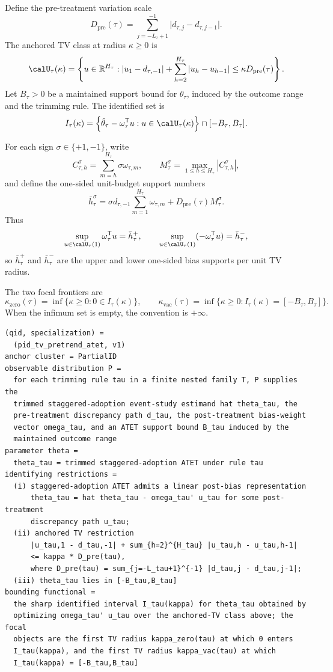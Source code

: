 \documentclass[11pt]{article}
\newcommand{\transpose}{\mathsf{T}}
\newcommand{\R}{\mathbb{R}}
\theoremstyle{definition}
\theoremstyle{plain}
\theoremstyle{remark}
\begin{document}
Define the pre-treatment variation scale
\[
  D_{\mathrm{pre}}(\tau)
  =
  \sum_{j=-L_\tau+1}^{-1}\big|d_{\tau,j}-d_{\tau,j-1}\big|.
\]
The anchored TV class at radius \(\kappa\ge 0\) is
\[
  \calU_\tau(\kappa)
  =
  \left\{
    u\in\R^{H_\tau}:
    |u_1-d_{\tau,-1}| + \sum_{h=2}^{H_\tau}|u_h-u_{h-1}|
    \le \kappa D_{\mathrm{pre}}(\tau)
  \right\}.
\]
Let \(B_\tau>0\) be a maintained support bound for \(\theta_\tau\), induced by the outcome range and the trimming rule. The identified set is
\[
  I_\tau(\kappa)
  =
  \left\{
    \hat\theta_\tau-\omega_\tau^\transpose u:
    u\in\calU_\tau(\kappa)
  \right\}
  \cap [-B_\tau,B_\tau].
\]

For each sign \(\sigma\in\{+1,-1\}\), write
\[
  C_{\tau,h}^{\sigma}
  =
  \sum_{m=h}^{H_\tau}\sigma\omega_{\tau,m},
  \qquad
  M_\tau^\sigma
  =
  \max_{1\le h\le H_\tau}|C_{\tau,h}^{\sigma}|,
\]
and define the one-sided unit-budget support numbers
\[
  \bar h_\tau^\sigma
  =
  \sigma d_{\tau,-1}\sum_{m=1}^{H_\tau}\omega_{\tau,m}
  +
  D_{\mathrm{pre}}(\tau) M_\tau^\sigma .
\]
Thus
\[
  \sup_{u\in\calU_\tau(1)}\omega_\tau^\transpose u=\bar h_\tau^{+},
  \qquad
  \sup_{u\in\calU_\tau(1)}(-\omega_\tau^\transpose u)=\bar h_\tau^{-},
\]
so \(\bar h_\tau^{+}\) and \(\bar h_\tau^{-}\) are the upper and lower one-sided bias supports per unit TV radius.

The two focal frontiers are
\[
  \kappa_{\mathrm{zero}}(\tau)
  =
  \inf\{\kappa\ge 0: 0\in I_\tau(\kappa)\},
  \qquad
  \kappa_{\mathrm{vac}}(\tau)
  =
  \inf\{\kappa\ge 0: I_\tau(\kappa)=[-B_\tau,B_\tau]\}.
\]
When the infimum set is empty, the convention is \(+\infty\).

\begin{verbatim}
(qid, specialization) =
  (pid_tv_pretrend_atet, v1)
anchor cluster = PartialID
observable distribution P =
  for each trimming rule tau in a finite nested family T, P supplies the
  trimmed staggered-adoption event-study estimand hat theta_tau, the
  pre-treatment discrepancy path d_tau, the post-treatment bias-weight
  vector omega_tau, and an ATET support bound B_tau induced by the
  maintained outcome range
parameter theta =
  theta_tau = trimmed staggered-adoption ATET under rule tau
identifying restrictions =
  (i) staggered-adoption ATET admits a linear post-bias representation
      theta_tau = hat theta_tau - omega_tau' u_tau for some post-treatment
      discrepancy path u_tau;
  (ii) anchored TV restriction
      |u_tau,1 - d_tau,-1| + sum_{h=2}^{H_tau} |u_tau,h - u_tau,h-1|
      <= kappa * D_pre(tau),
      where D_pre(tau) = sum_{j=-L_tau+1}^{-1} |d_tau,j - d_tau,j-1|;
  (iii) theta_tau lies in [-B_tau,B_tau]
bounding functional =
  the sharp identified interval I_tau(kappa) for theta_tau obtained by
  optimizing omega_tau' u_tau over the anchored-TV class above; the focal
  objects are the first TV radius kappa_zero(tau) at which 0 enters
  I_tau(kappa), and the first TV radius kappa_vac(tau) at which
  I_tau(kappa) = [-B_tau,B_tau]
\end{verbatim}
\end{document}

